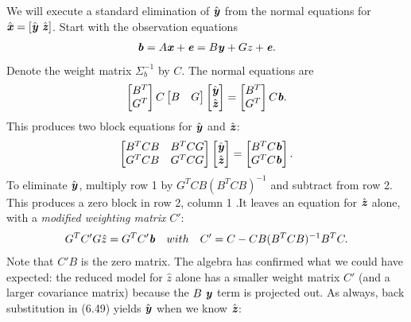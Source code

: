 We will execute a standard elimination of $\hat{\textbf{\textit{y}}}$ from the normal equations for $\hat{\textbf{\textit{x}}} = [\hat{\textbf{\textit{y}}} \ \hat{\textbf{\textit{z}}}]$. Start with the observation equations
\begin{align}
\textbf{\textit{b}} = A\textbf{\textit{x}} + \textbf{\textit{e}} = B \textbf{\textit{y}} + Gz + \textbf{\textit{e}}.
\end{align}
Denote the weight matrix $ \Sigma ^{-1}_{b}$ by $C$. The normal equations are
\begin{align}
\begin{bmatrix}
B^{T}\\
G^{T}
\end{bmatrix} C
\begin{bmatrix}
B & G
\end{bmatrix}
\begin{bmatrix}
\hat{\textbf{\textit{y}}}\\
\hat{\textbf{\textit{z}}}
\end{bmatrix} = 
\begin{bmatrix}
B^{T}\\
G^{T}
\end{bmatrix} C \textbf{\textit{b}}.
\end{align}
This produces two block equations for $\hat{\textbf{\textit{y}}}$ and $\hat{\textbf{\textit{z}}}$:
\begin{align}
\begin{bmatrix}
B^{T}CB & B^{T}CG \\
G^{T}CB & G^{T}CG
\end{bmatrix}
\begin{bmatrix}
\hat{\textbf{\textit{y}}}\\
\hat{\textbf{\textit{z}}}
\end{bmatrix} =
\begin{bmatrix}
B^{T}C \textbf{\textit{b}}\\
G^{T}C \textbf{\textit{b}}
\end{bmatrix}.
\end{align}
To eliminate $\hat{\textbf{\textit{y}}}$, multiply row 1 by $G^{T}CB(B^{T}CB)^{-1}$ and subtract from row 2. This produces a zero block in row 2, column 1 .It leaves an equation for $\hat{\textbf{\textit{z}}}$ alone, with a \textit{modified weighting matrix} $C'$:
\begin{align}
G^{T}C'G\hat{z} = G^{T}C'\textbf{\textit{b}} \quad
with
\quad
C' = C - CB(B^{T}CB)^{-1}B^{T}C.
\end{align}
Note that $C'B$ is the zero matrix. The algebra has confirmed what we could have expected: the reduced model for $\hat{z}$ alone has a smaller weight matrix $C'$ (and a larger covariance matrix) because the $B \ \textbf{\textit{y}}$ term is projected out. As always, back substitution in (6.49) yields $\hat{\textbf{\textit{y}}}$ when we know $\hat{\textbf{\textit{z}}}$:
